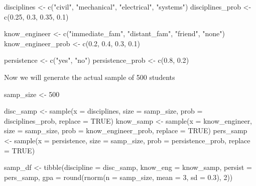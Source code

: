 \documentclass[
]{book}
\newenvironment{Shaded}{\begin{snugshade}}{\end{snugshade}}
\newcommand{\AttributeTok}[1]{\textcolor[rgb]{0.77,0.63,0.00}{#1}}
\newcommand{\ConstantTok}[1]{\textcolor[rgb]{0.00,0.00,0.00}{#1}}
\newcommand{\DecValTok}[1]{\textcolor[rgb]{0.00,0.00,0.81}{#1}}
\newcommand{\FloatTok}[1]{\textcolor[rgb]{0.00,0.00,0.81}{#1}}
\newcommand{\FunctionTok}[1]{\textcolor[rgb]{0.00,0.00,0.00}{#1}}
\newcommand{\NormalTok}[1]{#1}
\newcommand{\OtherTok}[1]{\textcolor[rgb]{0.56,0.35,0.01}{#1}}
\newcommand{\StringTok}[1]{\textcolor[rgb]{0.31,0.60,0.02}{#1}}
\begin{document}
\begin{Shaded}
\begin{Highlighting}[]
\NormalTok{disciplines }\OtherTok{\textless{}{-}} \FunctionTok{c}\NormalTok{(}\StringTok{"civil"}\NormalTok{, }\StringTok{"mechanical"}\NormalTok{, }\StringTok{"electrical"}\NormalTok{, }\StringTok{"systems"}\NormalTok{)}
\NormalTok{disciplines\_prob }\OtherTok{\textless{}{-}} \FunctionTok{c}\NormalTok{(}\FloatTok{0.25}\NormalTok{, }\FloatTok{0.3}\NormalTok{, }\FloatTok{0.35}\NormalTok{, }\FloatTok{0.1}\NormalTok{)}


\NormalTok{know\_engineer }\OtherTok{\textless{}{-}} \FunctionTok{c}\NormalTok{(}\StringTok{"immediate\_fam"}\NormalTok{, }\StringTok{"distant\_fam"}\NormalTok{, }\StringTok{"friend"}\NormalTok{, }\StringTok{"none"}\NormalTok{)}
\NormalTok{know\_engineer\_prob }\OtherTok{\textless{}{-}} \FunctionTok{c}\NormalTok{(}\FloatTok{0.2}\NormalTok{, }\FloatTok{0.4}\NormalTok{, }\FloatTok{0.3}\NormalTok{, }\FloatTok{0.1}\NormalTok{)}


\NormalTok{persistence }\OtherTok{\textless{}{-}} \FunctionTok{c}\NormalTok{(}\StringTok{"yes"}\NormalTok{, }\StringTok{"no"}\NormalTok{)}
\NormalTok{persistence\_prob }\OtherTok{\textless{}{-}} \FunctionTok{c}\NormalTok{(}\FloatTok{0.8}\NormalTok{, }\FloatTok{0.2}\NormalTok{)}
\end{Highlighting}
\end{Shaded}

Now we will generate the actual sample of 500 students

\begin{Shaded}
\begin{Highlighting}[]
\NormalTok{samp\_size }\OtherTok{\textless{}{-}} \DecValTok{500}

\NormalTok{disc\_samp }\OtherTok{\textless{}{-}} \FunctionTok{sample}\NormalTok{(}\AttributeTok{x =}\NormalTok{ disciplines, }\AttributeTok{size =}\NormalTok{ samp\_size, }\AttributeTok{prob =}\NormalTok{ disciplines\_prob, }\AttributeTok{replace =} \ConstantTok{TRUE}\NormalTok{)}
\NormalTok{know\_samp }\OtherTok{\textless{}{-}} \FunctionTok{sample}\NormalTok{(}\AttributeTok{x =}\NormalTok{ know\_engineer, }\AttributeTok{size =}\NormalTok{ samp\_size, }\AttributeTok{prob =}\NormalTok{ know\_engineer\_prob, }\AttributeTok{replace =} \ConstantTok{TRUE}\NormalTok{)}
\NormalTok{pers\_samp }\OtherTok{\textless{}{-}} \FunctionTok{sample}\NormalTok{(}\AttributeTok{x =}\NormalTok{ persistence, }\AttributeTok{size =}\NormalTok{ samp\_size, }\AttributeTok{prob =}\NormalTok{ persistence\_prob, }\AttributeTok{replace =} \ConstantTok{TRUE}\NormalTok{)}


\NormalTok{samp\_df }\OtherTok{\textless{}{-}} \FunctionTok{tibble}\NormalTok{(}\AttributeTok{discipline =}\NormalTok{ disc\_samp,}
                  \AttributeTok{know\_eng =}\NormalTok{ know\_samp,}
                  \AttributeTok{persist =}\NormalTok{ pers\_samp,}
                  \AttributeTok{gpa =} \FunctionTok{round}\NormalTok{(}\FunctionTok{rnorm}\NormalTok{(}\AttributeTok{n =}\NormalTok{ samp\_size, }\AttributeTok{mean =} \DecValTok{3}\NormalTok{, }\AttributeTok{sd =} \FloatTok{0.3}\NormalTok{), }\DecValTok{2}\NormalTok{))}
\end{Highlighting}
\end{Shaded}
\end{document}
